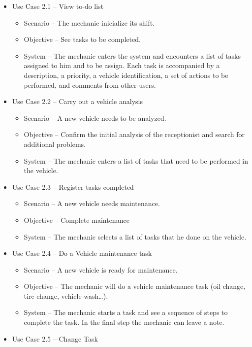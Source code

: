   \begin{itemize}
    \item Use Case 2.1 – View to-do list
    \begin{itemize}
      \item Scenario – The mechanic inicialize its shift.
      \item Objective – See tasks to be completed.
      \item System – The mechanic enters the system and encounters a list of tasks assigned to him and to be assign. Each task is accompanied by a description, a priority, a vehicle identification, a set of actions to be performed, and comments from other users. 
    \end{itemize}
    \item Use Case 2.2 – Carry out a vehicle analysis 
    \begin{itemize}
      \item Scenario – A new vehicle needs to be analyzed.
      \item Objective – Confirm the initial analysis of the receptionist and search for additional problems.
      \item System – The mechanic enters a list of tasks that need to be performed in the vehicle. 
    \end{itemize}
    \item Use Case 2.3 – Register tasks completed
    \begin{itemize}
      \item Scenario – A new vehicle needs maintenance.
      \item Objective – Complete maintenance
      \item System – The mechanic selects a list of tasks that he done on the vehicle.
    \end{itemize}
  \item Use Case 2.4 – Do a Vehicle maintenance task
  \begin{itemize}
    \item Scenario – A new vehicle is ready for maintenance.
    \item Objective – The mechanic will do a vehicle maintenance task (oil change, tire change, vehicle wash…).
    \item System – The mechanic starts a task and see a sequence of steps to complete the task. In the final step the mechanic can leave a note.
  \end{itemize}
  \item Use Case 2.5 – Change Task
  \begin{itemize}

\end{itemize}
\end{itemize}
